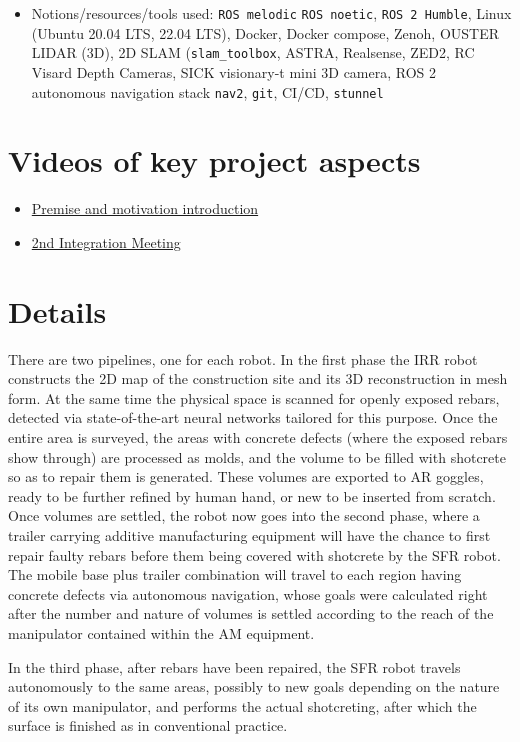 \begin{itemize}
  \item Notions/resources/tools used: \texttt{ROS melodic} \texttt{ROS noetic},
    \texttt{ROS 2 Humble}, Linux (Ubuntu 20.04 LTS, 22.04 LTS), Docker, Docker compose, Zenoh, OUSTER LIDAR (3D), 2D SLAM (\texttt{slam\_toolbox}, ASTRA, Realsense, ZED2, RC Visard Depth Cameras, SICK visionary-t mini 3D camera,  ROS 2 autonomous navigation stack \texttt{nav2}, \texttt{git}, CI/CD, \texttt{stunnel}
\end{itemize}


\section{Videos of key project aspects}

\begin{itemize}
  \singlespacing
  \item \href{https://www.youtube.com/watch?v=WxfIEvFEOGk}{Premise and motivation introduction}
  \item \href{https://www.youtube.com/watch?v=JWWN4qOTwPs}{2nd Integration Meeting}
\end{itemize}


\section{Details}

There are two pipelines, one for each robot. In the first phase the IRR robot
constructs the 2D map of the construction site and its 3D reconstruction in
mesh form. At the same time the physical space is scanned for openly exposed
rebars, detected via state-of-the-art neural networks tailored for this
purpose.  Once the entire area is surveyed, the areas with concrete defects
(where the exposed rebars show through) are processed as molds, and the volume
to be filled with shotcrete so as to repair them is generated. These volumes
are exported to AR goggles, ready to be further refined by human hand, or new
to be inserted from scratch. Once volumes are settled, the robot now goes into
the second phase, where a trailer carrying additive manufacturing equipment
will have the chance to first repair faulty rebars before them being covered
with shotcrete by the SFR robot. The mobile base plus trailer combination will
travel to each region having concrete defects via autonomous navigation, whose
goals were calculated right after the number and nature of volumes is settled
according to the reach of the manipulator contained within the AM equipment.

In the third phase, after rebars have been repaired, the SFR robot travels
autonomously to the same areas, possibly to new goals depending on the nature
of its own manipulator, and performs the actual shotcreting, after which the
surface is finished as in conventional practice.
